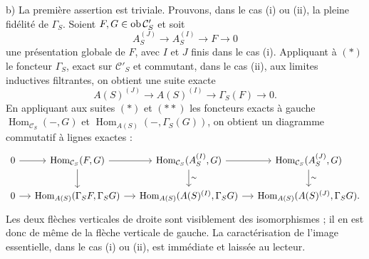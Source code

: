 \documentclass[11pt]{article}
\begin{document}
b) La première assertion est triviale. Prouvons, dans le cas (i) ou (ii), la pleine fidélité de $\Gamma_S$. Soient $F,G\in\operatorname{ob}\mathcal C'_S$ et soit
\[
A_S^{(J)}\longrightarrow A_S^{(I)}\longrightarrow F\longrightarrow0
\tag{$*$}
\]
une présentation globale de $F$, avec $I$ et $J$ finis dans le cas (i). Appliquant à $(*)$ le foncteur $\Gamma_S$, exact sur $\mathcal C'_S$ et commutant, dans le cas (ii), aux limites inductives filtrantes, on obtient une suite exacte
\[
A(S)^{(J)}\longrightarrow A(S)^{(I)}\longrightarrow\Gamma_S(F)\longrightarrow0.
\tag{$**$}
\]
En appliquant aux suites $(*)$ et $(**)$ les foncteurs exacts à gauche $\operatorname{Hom}_{\mathcal C_S}(-,G)$ et $\operatorname{Hom}_{A(S)}(-,\Gamma_S(G))$, on obtient un diagramme commutatif à lignes exactes :
\[
\begin{tikzcd}[column sep=small]
0 \arrow[r] & \operatorname{Hom}_{\mathcal C_S}(F,G) \arrow[r] \arrow[d] &
\operatorname{Hom}_{\mathcal C_S}(A_S^{(I)},G) \arrow[r] \arrow[d,"\sim"] &
\operatorname{Hom}_{\mathcal C_S}(A_S^{(J)},G) \arrow[d,"\sim"] \\
0 \arrow[r] & \operatorname{Hom}_{A(S)}(\Gamma_SF,\Gamma_SG) \arrow[r] &
\operatorname{Hom}_{A(S)}(A(S)^{(I)},\Gamma_SG) \arrow[r] &
\operatorname{Hom}_{A(S)}(A(S)^{(J)},\Gamma_SG).
\end{tikzcd}
\]
Les deux flèches verticales de droite sont visiblement des isomorphismes ; il en est donc de même de la flèche verticale de gauche. La caractérisation de l'image essentielle, dans le cas (i) ou (ii), est immédiate et laissée au lecteur.
\end{document}
